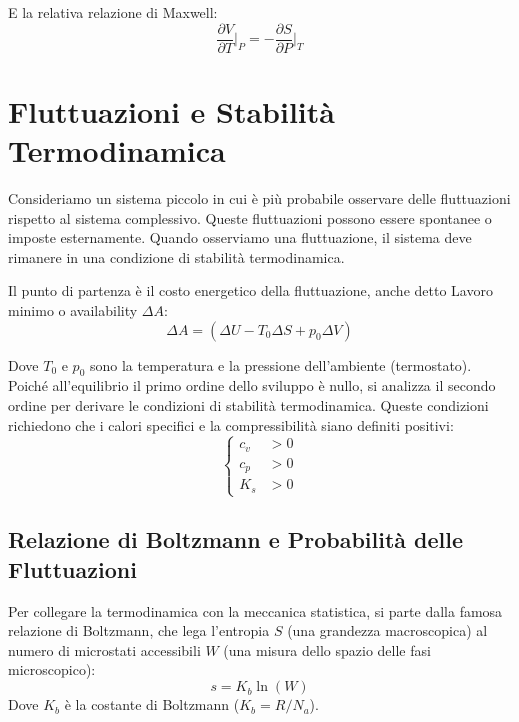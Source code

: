 E la relativa relazione di Maxwell:
\begin{equation}
    \frac{\partial V}{\partial T}\bigg|_{P}=-\frac{\partial S}{\partial P}\bigg|_{T}
    \label{eq:maxwell_G}
\end{equation}

\section{Fluttuazioni e Stabilità Termodinamica}

Consideriamo un sistema piccolo in cui è più probabile osservare delle fluttuazioni rispetto al sistema complessivo. Queste fluttuazioni possono essere spontanee o imposte esternamente. Quando osserviamo una fluttuazione, il sistema deve rimanere in una condizione di stabilità termodinamica.

Il punto di partenza è il costo energetico della fluttuazione, anche detto Lavoro minimo o availability $\Delta A$:
\begin{equation}
    \Delta A=(\Delta U-T_{0}\Delta S+p_{0}\Delta V)
    \label{eq:delta_A}
\end{equation}

Dove $T_0$ e $p_0$ sono la temperatura e la pressione dell'ambiente (termostato). Poiché all'equilibrio il primo ordine dello sviluppo è nullo, si analizza il secondo ordine per derivare le condizioni di stabilità termodinamica. Queste condizioni richiedono che i calori specifici e la compressibilità siano definiti positivi:
\begin{equation}
\begin{cases}
    c_{v}&>0 \\ c_{p}&>0 \\ K_{s}&>0
\end{cases}
\end{equation}

\subsection*{Relazione di Boltzmann e Probabilità delle Fluttuazioni}

Per collegare la termodinamica con la meccanica statistica, si parte dalla famosa relazione di Boltzmann, che lega l'entropia $S$ (una grandezza macroscopica) al numero di microstati accessibili $W$ (una misura dello spazio delle fasi microscopico):
\begin{equation}
    s=K_{b}\ln (W)
    \label{eq:boltzmann}
\end{equation}
Dove $K_b$ è la costante di Boltzmann ($K_b = R/N_a$).

